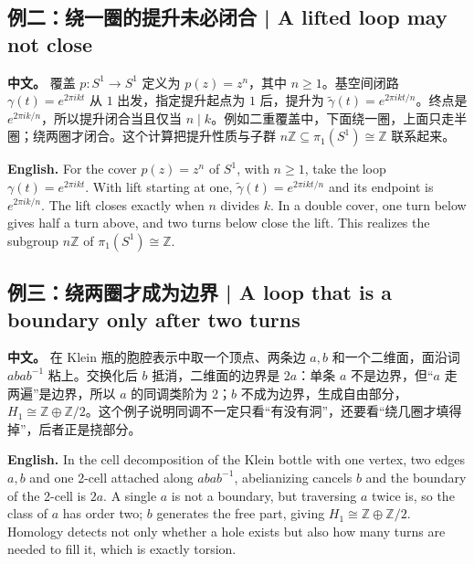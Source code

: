 \documentclass[UTF8,11pt,a4paper]{ctexart}
\newcommand{\APS}[2]{\par\noindent\textbf{中文。} #1\par\noindent\textbf{English.} #2\par\smallskip}
\begin{document}
\subsection*{例二：绕一圈的提升未必闭合 | A lifted loop may not close}
\APS{覆盖 $p:S^1\to S^1$ 定义为 $p(z)=z^n$，其中 $n\ge1$。基空间闭路 $\gamma(t)=e^{2\pi i kt}$ 从 $1$ 出发，指定提升起点为 $1$ 后，提升为 $\widetilde\gamma(t)=e^{2\pi i kt/n}$。终点是 $e^{2\pi ik/n}$，所以提升闭合当且仅当 $n\mid k$。例如二重覆盖中，下面绕一圈，上面只走半圈；绕两圈才闭合。这个计算把提升性质与子群 $n\mathbb Z\subseteq\pi_1(S^1)\cong\mathbb Z$ 联系起来。}{For the cover $p(z)=z^n$ of $S^1$, with $n\ge1$, take the loop $\gamma(t)=e^{2\pi ikt}$. With lift starting at one, $\widetilde\gamma(t)=e^{2\pi ikt/n}$ and its endpoint is $e^{2\pi ik/n}$. The lift closes exactly when $n$ divides $k$. In a double cover, one turn below gives half a turn above, and two turns below close the lift. This realizes the subgroup $n\mathbb Z$ of $\pi_1(S^1)\cong\mathbb Z$.}


\subsection*{例三：绕两圈才成为边界 | A loop that is a boundary only after two turns}
\APS{在 Klein 瓶的胞腔表示中取一个顶点、两条边 $a,b$ 和一个二维面，面沿词 $abab^{-1}$ 粘上。交换化后 $b$ 抵消，二维面的边界是 $2a$：单条 $a$ 不是边界，但“$a$ 走两遍”是边界，所以 $a$ 的同调类阶为 $2$；$b$ 不成为边界，生成自由部分，$H_1\cong\mathbb Z\oplus\mathbb Z/2$。这个例子说明同调不一定只看“有没有洞”，还要看“绕几圈才填得掉”，后者正是挠部分。}{In the cell decomposition of the Klein bottle with one vertex, two edges $a,b$ and one 2-cell attached along $abab^{-1}$, abelianizing cancels $b$ and the boundary of the 2-cell is $2a$. A single $a$ is not a boundary, but traversing $a$ twice is, so the class of $a$ has order two; $b$ generates the free part, giving $H_1\cong\mathbb Z\oplus\mathbb Z/2$. Homology detects not only whether a hole exists but also how many turns are needed to fill it, which is exactly torsion.}
\end{document}
